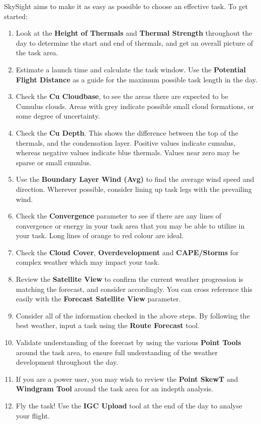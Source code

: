 \documentclass[9pt,a4paper,twocolumn]{article}
\begin{document}
SkySight aims to make it as easy as possible to choose an effective task. To get started:

\begin{enumerate}
\item Look at the \textbf{Height of Thermals} and \textbf{Thermal Strength} throughout the day to determine the start and end of thermals, and get an overall picture of the task area.
\item Estimate a launch time and calculate the task window. Use the \textbf{Potential Flight Distance} as a guide for the maximum possible task length in the day.
\item Check the \textbf{Cu Cloudbase}, to see the areas there are expected to be Cumulus clouds. Areas with grey indicate possible small cloud formations, or some degree of uncertainty.
\item Check the \textbf{Cu Depth}. This shows the difference between the top of the thermals, and the condensation layer. Positive values indicate cumulus, whereas negative values indicate blue thermals. Values near zero may be sparse or small cumulus.
\item Use the \textbf{Boundary Layer Wind (Avg)} to find the average wind speed and direction. Wherever possible, consider lining up task legs with the prevailing wind.
\item Check the \textbf{Convergence} parameter to see if there are any lines of convergence or energy in your task area that you may be able to utilize in your task. Long lines of orange to red colour are ideal.
\item Check the \textbf{Cloud Cover}, \textbf{Overdevelopment} and \textbf{CAPE/Storms} for complex weather which may impact your task.
\item Review the \textbf{Satellite View} to confirm the current weather progression is matching the forecast, and consider accordingly. You can cross reference this easily with the \textbf{Forecast Satellite View} parameter.
\item Consider all of the information checked in the above steps. By following the best weather, input a task using the \textbf{Route Forecast} tool.
\item Validate understanding of the forecast by using the various \textbf{Point Tools} around the task area, to ensure full understanding of the weather development throughout the day.
\item If you are a power user, you may wish to review the \textbf{Point SkewT} and \textbf{Windgram Tool} around the task area for an indepth analysis.
\item Fly the task! Use the \textbf{IGC Upload} tool at the end of the day to analyse your flight.

\end{enumerate}
\end{document}
